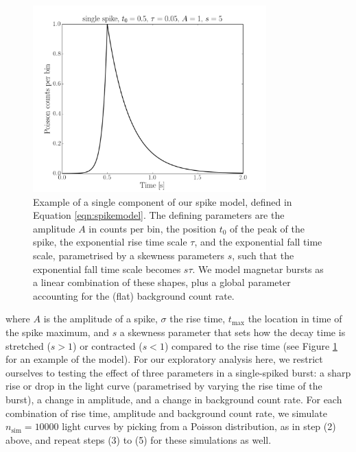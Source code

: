 \documentclass[numberedappendix]{emulateapj}
\begin{document}
\begin{figure}[htbp]
\begin{center}
\includegraphics[width=9cm]{f5.pdf}
\caption{Example of a single component of our spike model, defined in Equation \ref{eqn:spikemodel}. The defining parameters are the amplitude $A$ in counts per bin, the position $t_0$ of the peak of the spike,  the exponential rise time scale $\tau$, and the exponential fall time scale, parametrised by a skewness parameters $s$, such that the exponential fall time scale becomes $s\tau$. We model magnetar bursts as a linear combination of these shapes, plus a global parameter accounting for the (flat) background count rate.}
\label{fig:example_spike}
\end{center}
\end{figure}

where $A$ is the amplitude of a spike, $\sigma$ the rise time, $t_\mathrm{max}$ the location in time of the spike maximum, and $s$ a skewness parameter that sets how the decay time is stretched ($s > 1$) or contracted ($s < 1$) compared to the rise time (see Figure \ref{fig:example_spike} for an example of the model). 
For our exploratory analysis here, we restrict ourselves to testing the effect of three parameters in a single-spiked burst: a sharp rise or drop in the light curve (parametrised by varying the rise time of the burst), a change in amplitude, and a change in background count rate. For each combination of rise time, amplitude and 
background count rate, we simulate $n_{\mathrm{sim}} = 10000$  light curves by picking from a Poisson distribution, as in step (2) above, and repeat steps (3) to (5) for these simulations as well. 
\end{document}
